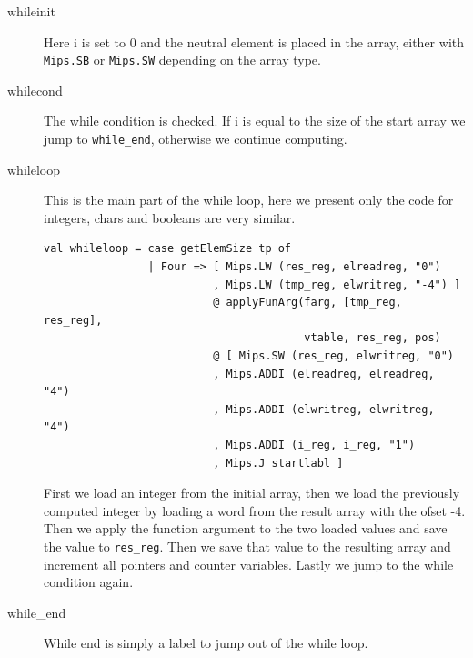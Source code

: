 \documentclass[11pt]{article}
\begin{document}
\begin{description}
        \item [whileinit] Here i is set to 0 and the neutral element is placed
            in the array, either with \texttt{Mips.SB} or \texttt{Mips.SW}
            depending on the array type.

        \item [whilecond] The while condition is checked.  If i is equal to the
            size of the start array we jump to \texttt{while\_end}, otherwise
            we continue computing.

        \item [whileloop] This is the main part of the while loop, here we
            present only the code for integers, chars and booleans are very
            similar.

            \begin{lstlisting}[basicstyle=\small]
val whileloop = case getElemSize tp of
                | Four => [ Mips.LW (res_reg, elreadreg, "0")
                          , Mips.LW (tmp_reg, elwritreg, "-4") ]
                          @ applyFunArg(farg, [tmp_reg, res_reg],
                                        vtable, res_reg, pos)
                          @ [ Mips.SW (res_reg, elwritreg, "0")
                          , Mips.ADDI (elreadreg, elreadreg, "4")
                          , Mips.ADDI (elwritreg, elwritreg, "4")
                          , Mips.ADDI (i_reg, i_reg, "1")
                          , Mips.J startlabl ]
            \end{lstlisting}

            First we load an integer from the initial array, then we load the
            previously computed integer by loading a word from the result array
            with the ofset -4.  Then we apply the function argument to the two
            loaded values and save the value to \texttt{res\_reg}.  Then we save
            that value to the resulting array and increment all pointers and
            counter variables.  Lastly we jump to the while condition again.

        \item [while\_end] While end is simply a label to jump out of the while
            loop.
    \end{description}
\end{document}
